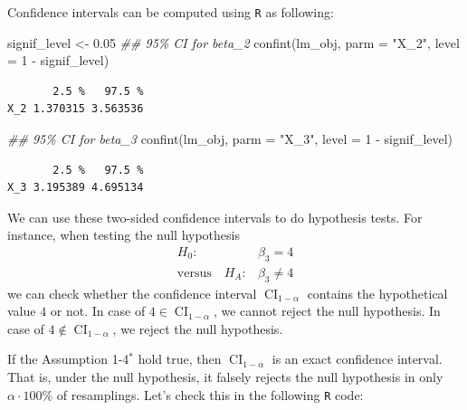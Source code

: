 \documentclass[
  letterpaper,
  DIV=11,
  numbers=noendperiod]{scrreprt}
\newenvironment{Shaded}{\begin{snugshade}}{\end{snugshade}}
\newcommand{\AttributeTok}[1]{\textcolor[rgb]{0.40,0.45,0.13}{#1}}
\newcommand{\DecValTok}[1]{\textcolor[rgb]{0.68,0.00,0.00}{#1}}
\newcommand{\DocumentationTok}[1]{\textcolor[rgb]{0.37,0.37,0.37}{\textit{#1}}}
\newcommand{\FloatTok}[1]{\textcolor[rgb]{0.68,0.00,0.00}{#1}}
\newcommand{\FunctionTok}[1]{\textcolor[rgb]{0.28,0.35,0.67}{#1}}
\newcommand{\NormalTok}[1]{\textcolor[rgb]{0.00,0.23,0.31}{#1}}
\newcommand{\OtherTok}[1]{\textcolor[rgb]{0.00,0.23,0.31}{#1}}
\newcommand{\SpecialCharTok}[1]{\textcolor[rgb]{0.37,0.37,0.37}{#1}}
\newcommand{\StringTok}[1]{\textcolor[rgb]{0.13,0.47,0.30}{#1}}
\theoremstyle{definition}
\theoremstyle{plain}
\theoremstyle{plain}
\theoremstyle{remark}
\begin{document}
Confidence intervals can be computed using \texttt{R} as following:

\begin{Shaded}
\begin{Highlighting}[]
\NormalTok{signif\_level }\OtherTok{\textless{}{-}} \FloatTok{0.05}
\DocumentationTok{\#\# 95\% CI for beta\_2}
\FunctionTok{confint}\NormalTok{(lm\_obj, }\AttributeTok{parm =} \StringTok{"X\_2"}\NormalTok{, }\AttributeTok{level =} \DecValTok{1} \SpecialCharTok{{-}}\NormalTok{ signif\_level)}
\end{Highlighting}
\end{Shaded}

\begin{verbatim}
       2.5 %   97.5 %
X_2 1.370315 3.563536
\end{verbatim}

\begin{Shaded}
\begin{Highlighting}[]
\DocumentationTok{\#\# 95\% CI for beta\_3 }
\FunctionTok{confint}\NormalTok{(lm\_obj, }\AttributeTok{parm =} \StringTok{"X\_3"}\NormalTok{, }\AttributeTok{level =} \DecValTok{1} \SpecialCharTok{{-}}\NormalTok{ signif\_level)}
\end{Highlighting}
\end{Shaded}

\begin{verbatim}
       2.5 %   97.5 %
X_3 3.195389 4.695134
\end{verbatim}

We can use these two-sided confidence intervals to do hypothesis tests.
For instance, when testing the null hypothesis \begin{align*}
H_0:&\beta_3=4\\
\text{versus}\quad H_A: &\beta_3\neq 4
\end{align*} we can check whether the confidence interval
\(\operatorname{CI}_{1-\alpha}\) contains the hypothetical value \(4\)
or not. In case of \(4\in \operatorname{CI}_{1-\alpha}\), we cannot
reject the null hypothesis. In case of
\(4\not\in \operatorname{CI}_{1-\alpha}\), we reject the null
hypothesis.

If the Assumption 1-4\(^\ast\) hold true, then
\(\operatorname{CI}_{1-\alpha}\) is an exact confidence interval. That
is, under the null hypothesis, it falsely rejects the null hypothesis in
only \(\alpha\cdot 100\%\) of resamplings. Let's check this in the
following \texttt{R} code:
\end{document}
